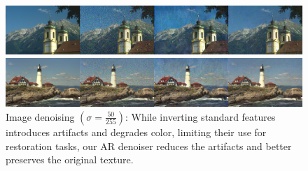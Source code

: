 \begin{figure}[t]
\begin{minipage}{0.25\textwidth}
\centering\textbf{\colorbox{white}{}}
\end{minipage}\begin{minipage}[t]{0.25\textwidth}
\centering \textbf{\colorbox{white}{}}
\end{minipage}\begin{minipage}[t]{0.25\textwidth}
\centering \textbf{\colorbox{white}{}}
\end{minipage}\begin{minipage}[t]{0.25\textwidth}
\centering\textbf{\colorbox{white}{}}
\end{minipage}

\vspace{-0.05 cm}
\includegraphics[width=1\textwidth]{figs/denoising/cbsd68_tile20.jpg}

\includegraphics[width=1\textwidth]{figs/denoising/kodak24_tile20.jpg}

\caption{\label{fig:denoising}Image denoising $(\sigma= \frac{50}{255})$: While inverting standard features introduces artifacts and degrades color, limiting their use for restoration tasks, our AR denoiser reduces the artifacts and better preserves the original texture.}
\vspace{-0.5 cm}
\end{figure}
